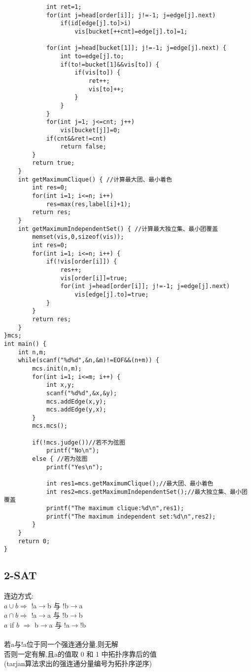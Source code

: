 \documentclass[twocolumn,a4]{article}
\begin{document}
\begin{lstlisting}
            int ret=1;
            for(int j=head[order[i]]; j!=-1; j=edge[j].next)
                if(id[edge[j].to]>i)
                    vis[bucket[++cnt]=edge[j].to]=1;
 
            for(int j=head[bucket[1]]; j!=-1; j=edge[j].next) {
                int to=edge[j].to;
                if(to!=bucket[1]&&vis[to]) {
                    if(vis[to]) {
                        ret++;
                        vis[to]++;
                    }
                }
            }
            for(int j=1; j<=cnt; j++)
                vis[bucket[j]]=0;
            if(cnt&&ret!=cnt)
                return false;
        }
        return true;
    }
    int getMaximumClique() { //计算最大团、最小着色
        int res=0;
        for(int i=1; i<=n; i++)
            res=max(res,label[i]+1);
        return res;
    }
    int getMaximumIndependentSet() { //计算最大独立集、最小团覆盖
        memset(vis,0,sizeof(vis));
        int res=0;
        for(int i=1; i<=n; i++) {
            if(!vis[order[i]]) {
                res++;
                vis[order[i]]=true;
                for(int j=head[order[i]]; j!=-1; j=edge[j].next)
                    vis[edge[j].to]=true;
            }
        }
        return res;
    }
}mcs;
int main() {
    int n,m;
    while(scanf("%d%d",&n,&m)!=EOF&&(n+m)) {
        mcs.init(n,m);
        for(int i=1; i<=m; i++) {
            int x,y;
            scanf("%d%d",&x,&y);
            mcs.addEdge(x,y);
            mcs.addEdge(y,x);
        }
        mcs.mcs();
 
        if(!mcs.judge())//若不为弦图
            printf("No\n");
        else { //若为弦图
            printf("Yes\n");
 
            int res1=mcs.getMaximumClique();//最大团、最小着色
            int res2=mcs.getMaximumIndependentSet();//最大独立集、最小团覆盖
            printf("The maximum clique:%d\n",res1);
            printf("The maximum independent set:%d\n",res2);
        }
    }
    return 0;
}
\end{lstlisting}


\subsection{2-SAT}

连边方式:\\
$a\cup b \Rightarrow $ !a$\rightarrow$b 与 !b$\rightarrow$a\\
$a\cap b \Rightarrow $ !a$\rightarrow$a 与 !b$\rightarrow$b\\
$a$ if $b$ $\Rightarrow $ b$\rightarrow$a 与 !a$\rightarrow$!b\\
\\
若a与!a位于同一个强连通分量,则无解\\
否则一定有解,且a的值取 0 和 1 中拓扑序靠后的值\\
(tarjan算法求出的强连通分量编号为拓扑序逆序)
\end{document}
